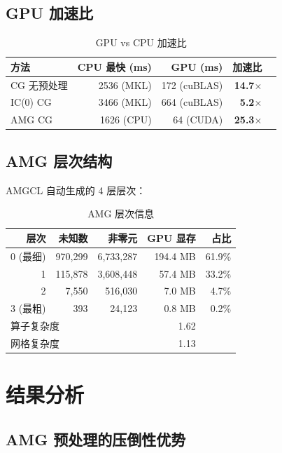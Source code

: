 \documentclass[12pt,a4paper]{ctexart}
\begin{document}
\subsection{GPU 加速比}

\begin{table}[htbp]
\centering
\caption{GPU vs CPU 加速比}
\label{tab:gpu}
\begin{tabular}{lrrrr}
\toprule
方法 & CPU 最快 (ms) & GPU (ms) & 加速比 \\
\midrule
CG 无预处理 & 2536 (MKL) & 172 (cuBLAS) & \textbf{14.7$\times$} \\
IC(0) CG & 3466 (MKL) & 664 (cuBLAS) & \textbf{5.2$\times$} \\
AMG CG & 1626 (CPU) & 64 (CUDA) & \textbf{25.3$\times$} \\
\bottomrule
\end{tabular}
\end{table}

\subsection{AMG 层次结构}

AMGCL 自动生成的 4 层层次：

\begin{table}[htbp]
\centering
\caption{AMG 层次信息}
\label{tab:amg}
\begin{tabular}{rrrrr}
\toprule
层次 & 未知数 & 非零元 & GPU 显存 & 占比 \\
\midrule
0 (最细) & 970,299 & 6,733,287 & 194.4 MB & 61.9\% \\
1 & 115,878 & 3,608,448 & 57.4 MB & 33.2\% \\
2 & 7,550 & 516,030 & 7.0 MB & 4.7\% \\
3 (最粗) & 393 & 24,123 & 0.8 MB & 0.2\% \\
\midrule
\multicolumn{3}{l}{算子复杂度} & 1.62 & \\
\multicolumn{3}{l}{网格复杂度} & 1.13 & \\
\bottomrule
\end{tabular}
\end{table}

\section{结果分析}

\subsection{AMG 预处理的压倒性优势}
\end{document}
